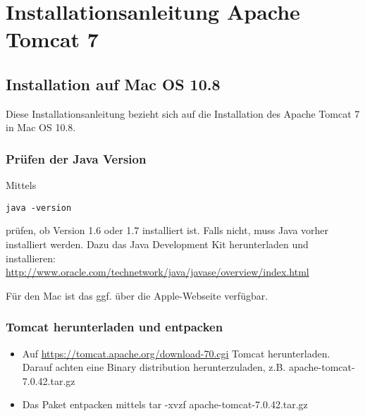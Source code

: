 \chapter{Installationsanleitung Apache Tomcat 7}\label{kap:anhangtomcat}

\section{Installation auf Mac OS 10.8}

Diese Installationsanleitung bezieht sich auf die Installation des Apache Tomcat 7 in Mac OS 10.8. 

\subsection{Prüfen der Java Version}

Mittels 

\lstinline[basicstyle=\ttfamily\small\mdseries]{java -version}

prüfen, ob Version 1.6 oder 1.7 installiert ist. Falls nicht, muss Java vorher installiert werden. Dazu das Java Development Kit herunterladen und installieren: \\ 
\href{http://www.oracle.com/technetwork/java/javase/overview/index.html}{http://www.oracle.com/technetwork/java/javase/overview/index.html}

Für den Mac ist das ggf. über die Apple-Webseite verfügbar. 

\subsection{Tomcat herunterladen und entpacken}

\begin{itemize}
\item Auf \href{https://tomcat.apache.org/download-70.cgi}{https://tomcat.apache.org/download-70.cgi} Tomcat herunterladen. Darauf achten eine Binary distribution herunterzuladen, z.B. apache-tomcat-7.0.42.tar.gz
\item Das Paket entpacken mittels tar -xvzf apache-tomcat-7.0.42.tar.gz
\end{itemize}


